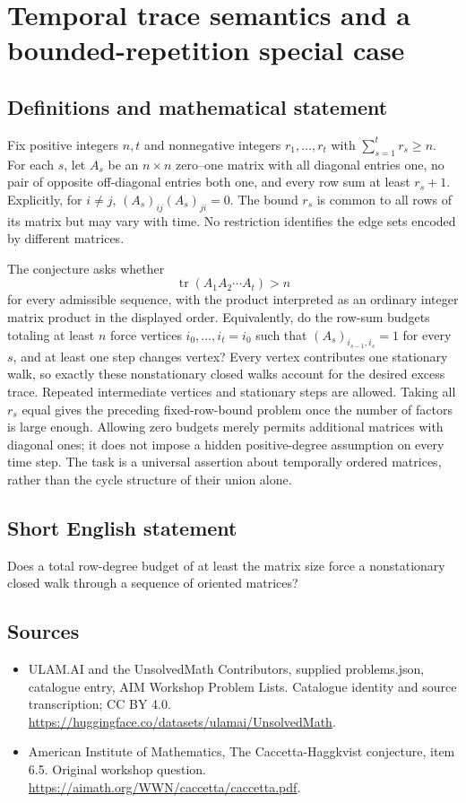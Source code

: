 \documentclass[11pt,a4paper]{article}
\begin{document}
\section*{Temporal trace semantics and a bounded-repetition special case}\label{statement}

\subsection{Definitions and mathematical statement}
Fix positive integers $n,t$ and nonnegative integers $r_1,\ldots,r_t$ with
$\sum_{s=1}^t r_s\geq n$.
For each $s$, let $A_s$ be an $n\times n$ zero--one matrix with all diagonal entries one, no pair of opposite off-diagonal entries both one, and every row sum at least $r_s+1$.
Explicitly, for $i\ne j$,
$(A_s)_{ij}(A_s)_{ji}=0$.
The bound $r_s$ is common to all rows of its matrix but may vary with time.
No restriction identifies the edge sets encoded by different matrices.

The conjecture asks whether
\[
 \operatorname{tr}(A_1A_2\cdots A_t)>n
\]
for every admissible sequence, with the product interpreted as an ordinary integer matrix product in the displayed order.
Equivalently, do the row-sum budgets totaling at least $n$ force vertices $i_0,\ldots,i_t=i_0$ such that
$(A_s)_{i_{s-1},i_s}=1$ for every $s$, and at least one step changes vertex?
Every vertex contributes one stationary walk, so exactly these nonstationary closed walks account for the desired excess trace.
Repeated intermediate vertices and stationary steps are allowed.
Taking all $r_s$ equal gives the preceding fixed-row-bound problem once the number of factors is large enough.
Allowing zero budgets merely permits additional matrices with diagonal ones; it does not impose a hidden positive-degree assumption on every time step.
The task is a universal assertion about temporally ordered matrices, rather than the cycle structure of their union alone.
\subsection{Short English statement}
Does a total row-degree budget of at least the matrix size force a nonstationary closed walk through a sequence of oriented matrices?
\subsection{Sources}
\begin{itemize}
\item[S1] ULAM.AI and the UnsolvedMath Contributors, supplied problems.json, catalogue entry, AIM Workshop Problem Lists. Catalogue identity and source transcription; CC BY 4.0.
\url{https://huggingface.co/datasets/ulamai/UnsolvedMath}.
\item[S2] American Institute of Mathematics, The Caccetta-Haggkvist conjecture, item 6.5. Original workshop question.
\url{https://aimath.org/WWN/caccetta/caccetta.pdf}.
\end{itemize}
\end{document}
